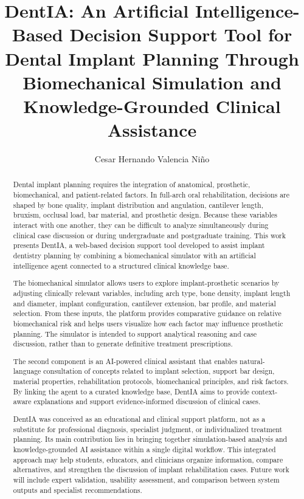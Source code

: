 \documentclass[5p,twocolumn,times]{elsarticle}
\begin{document}
\begin{frontmatter}

\title{DentIA: An Artificial Intelligence-Based Decision Support Tool for Dental Implant Planning Through Biomechanical Simulation and Knowledge-Grounded Clinical Assistance}

\author[ust]{Cesar Hernando Valencia Niño}
\address[ust]{Facultad de Ingeniería Mecatrónica, Universidad Santo Tomás - Seccional Bucaramanga, Colombia}

\begin{abstract}
Dental implant planning requires the integration of anatomical, prosthetic, biomechanical, and patient-related factors. In full-arch oral rehabilitation, decisions are shaped by bone quality, implant distribution and angulation, cantilever length, bruxism, occlusal load, bar material, and prosthetic design. Because these variables interact with one another, they can be difficult to analyze simultaneously during clinical case discussion or during undergraduate and postgraduate training. This work presents DentIA, a web-based decision support tool developed to assist implant dentistry planning by combining a biomechanical simulator with an artificial intelligence agent connected to a structured clinical knowledge base.

The biomechanical simulator allows users to explore implant-prosthetic scenarios by adjusting clinically relevant variables, including arch type, bone density, implant length and diameter, implant configuration, cantilever extension, bar profile, and material selection. From these inputs, the platform provides comparative guidance on relative biomechanical risk and helps users visualize how each factor may influence prosthetic planning. The simulator is intended to support analytical reasoning and case discussion, rather than to generate definitive treatment prescriptions.

The second component is an AI-powered clinical assistant that enables natural-language consultation of concepts related to implant selection, support bar design, material properties, rehabilitation protocols, biomechanical principles, and risk factors. By linking the agent to a curated knowledge base, DentIA aims to provide context-aware explanations and support evidence-informed discussion of clinical cases.

DentIA was conceived as an educational and clinical support platform, not as a substitute for professional diagnosis, specialist judgment, or individualized treatment planning. Its main contribution lies in bringing together simulation-based analysis and knowledge-grounded AI assistance within a single digital workflow. This integrated approach may help students, educators, and clinicians organize information, compare alternatives, and strengthen the discussion of implant rehabilitation cases. Future work will include expert validation, usability assessment, and comparison between system outputs and specialist recommendations.
\end{abstract}


\end{frontmatter}
\end{document}
